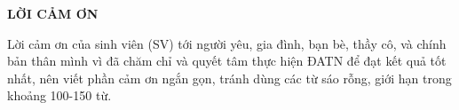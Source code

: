 \documentclass[../LuanVan.tex]{subfiles}
\begin{document}
\begin{center}
    \Large{\textbf{LỜI CẢM ƠN}}\\
\end{center}
\vspace{1cm}
Lời cảm ơn của sinh viên (SV) tới người yêu, gia đình, bạn bè, thầy cô, và chính bản thân mình vì đã chăm chỉ và quyết tâm thực hiện ĐATN để đạt kết quả tốt nhất, nên viết phần cảm ơn ngắn gọn, tránh dùng các từ sáo rỗng, giới hạn trong khoảng 100-150 từ. 
\end{document}
